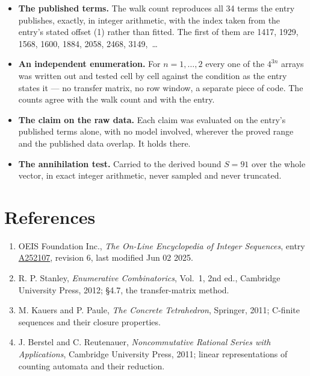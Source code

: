 \documentclass[11pt]{article}
\theoremstyle{definition}
\begin{document}
\begin{itemize}

\item {\bfseries The published terms.} The walk count reproduces all 34 terms the entry publishes, exactly, in integer arithmetic, with the index taken from the entry's stated offset (1) rather than fitted. The first of them are 1417, 1929, 1568, 1600, 1884, 2058, 2468, 3149,~\dots

\item {\bfseries An independent enumeration.} For $n = 1,\dots,2$ every one of the $4^{3n}$ arrays was written out and tested cell by cell against the condition as the entry states it --- no transfer matrix, no row window, a separate piece of code. The counts agree with the walk count and with the entry.

\item {\bfseries The claim on the raw data.} Each claim was evaluated on the entry's published terms alone, with no model involved, wherever the proved range and the published data overlap. It holds there.

\item {\bfseries The annihilation test.} Carried to the derived bound $S = 91$ over the whole vector, in exact integer arithmetic, never sampled and never truncated.

\end{itemize}

\section{References}

\begin{enumerate}

\item OEIS Foundation Inc., \emph{The On-Line Encyclopedia of Integer Sequences}, entry \href{https://oeis.org/A252107}{A252107}, revision 6, last modified Jun 02 2025.

\item R. P. Stanley, \emph{Enumerative Combinatorics}, Vol.~1, 2nd ed., Cambridge University Press, 2012; \S4.7, the transfer-matrix method.

\item M. Kauers and P. Paule, \emph{The Concrete Tetrahedron}, Springer, 2011; C-finite sequences and their closure properties.

\item J. Berstel and C. Reutenauer, \emph{Noncommutative Rational Series with Applications}, Cambridge University Press, 2011; linear representations of counting automata and their reduction.

\end{enumerate}
\end{document}
